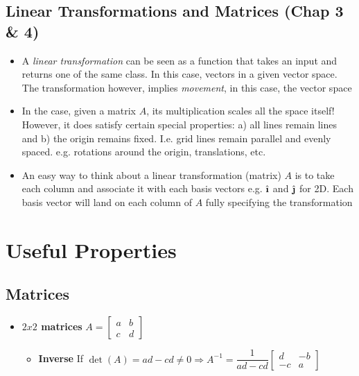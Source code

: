\documentclass[pdftex,11pt,a4paper]{article}
\newcommand{\ihat}{\hat{\textbf{\i}}}
\newcommand{\jhat}{\hat{\textbf{\j}}}
\begin{document}
\subsection{Linear Transformations and Matrices (Chap 3 \& 4)}
\begin{itemize}
	\item A \textit{linear transformation} can be seen as a function that takes an input and returns one of the same class. In this case, vectors in a given vector space. The transformation however, implies \textit{movement}, in this case, the vector space
	\item In the case, given a matrix $A$, its multiplication scales all the space itself! However, it does satisfy certain special properties: a) all lines remain lines and b) the origin remains fixed. I.e. grid lines remain parallel and evenly spaced. e.g. rotations around the origin, translations, etc. 
	\item An easy way to think about a linear transformation (matrix) $A$ is to take each column and associate it with each basis vectors e.g. $\ihat$ and $\jhat$ for 2D. Each basis vector will land on each column of $A$ fully specifying the transformation
\end{itemize}



\section{Useful Properties}
\subsection{Matrices}
\begin{itemize}
	\item \textbf{$2x2$ matrices}
	$A = \begin{bmatrix}
	a&b\\c&d
	\end{bmatrix} $
	\begin{itemize}
		\item \textbf{Inverse} If $\det(A) = ad -cd \neq 0 \Rightarrow A^{-1} = \dfrac{1}{ad-cd}	\begin{bmatrix}
			d & -b \\
			-c & a
		\end{bmatrix}$
	\end{itemize}
\end{itemize}
\end{document}
